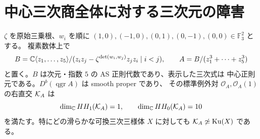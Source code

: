 \section{中心三次商全体に対する三次元の障害}
\label{qfo:sec:obstruction}

\begin{theorem}\label{qfo:thm:obstruction}
$\zeta$ を原始三乗根、$w_i$ を順に
$(1,0),(-1,0),(0,1),(0,-1),(0,0)\in\mathbb F_3^2$ とする。
複素数体上で
\[
 B=\mathbb C\langle z_1,\ldots,z_5\rangle/
 (z_i z_j-\zeta^{\det(w_i,w_j)}z_j z_i\mid i<j),\qquad
 A=B/(z_1^3+\cdots+z_5^3)
\]
と置く。$B$ は次元・指数 $5$ の AS 正則代数であり、表示した三次式は
中心正則元である。$D^b(\operatorname{qgr}A)$ は smooth proper であり、
その標準例外対 $\mathcal O_A,\mathcal O_A(1)$ の右直交 $\mathcal K_A$ は
\[
 \dim_\mathbb C HH_1(\mathcal K_A)=1,\qquad \dim_\mathbb C HH_0(\mathcal K_A)=10
\]
を満たす。特にどの滑らかな可換三次三様体 $X$ に対しても
$\mathcal K_A\not\simeq\operatorname{Ku}(X)$ である。
\end{theorem}

